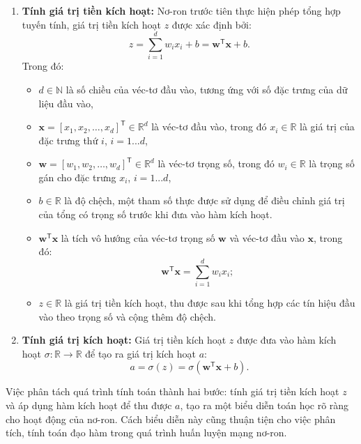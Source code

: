 \begin{enumerate}
    \item \textbf{Tính giá trị tiền kích hoạt:} Nơ-ron trước tiên thực hiện phép tổng hợp tuyến tính, giá trị tiền kích hoạt \(z\) được xác định bởi:
\begin{equation*}
    z = \sum_{i=1}^{d} w_i x_i + b
      = \mathbf{w}^{\mathsf T}\mathbf{x}+b.
\end{equation*}
Trong đó:
\begin{itemize}
    \item \(d\in\mathbb{N}\) là số chiều của véc-tơ đầu vào, tương ứng với số đặc trưng của dữ liệu đầu vào,
    
    \item \(\mathbf{x}=[x_1,x_2,\ldots,x_d]^{\mathsf T}\in\mathbb{R}^d\) là véc-tơ đầu vào, trong đó \(x_i\in\mathbb{R}\) là giá trị của đặc trưng thứ \(i\), $i = 1...d$,
    
    \item \(\mathbf{w}=[w_1,w_2,\ldots,w_d]^{\mathsf T}\in\mathbb{R}^d\) là véc-tơ trọng số, trong đó \(w_i\in\mathbb{R}\) là trọng số gán cho đặc trưng \(x_i\), $i = 1...d$,
    
    \item \(b\in\mathbb{R}\) là độ chệch, một tham số thực được sử dụng để điều chỉnh giá trị của tổng có trọng số trước khi đưa vào hàm kích hoạt.

    \item $\mathbf{w}^{\mathsf T}\mathbf{x}$ là tích vô hướng của véc-tơ trọng số $\mathbf{w}$ và véc-tơ đầu vào $\mathbf{x}$, trong đó: $$\mathbf{w}^{\mathsf T}\mathbf{x}
    =\sum_{i=1}^{d}w_i x_i;$$
    
    \item \(z\in\mathbb{R}\) là giá trị tiền kích hoạt, thu được sau khi tổng hợp các tín hiệu đầu vào theo trọng số và cộng thêm độ chệch.
    \end{itemize}
    
    \item \textbf{Tính giá trị kích hoạt:} Giá trị tiền kích hoạt \(z\) được đưa vào hàm kích hoạt \(\sigma:\mathbb{R}\rightarrow\mathbb{R}\) để tạo ra giá trị kích hoạt \(a\):
    \begin{equation*}
    a=\sigma(z)
    =\sigma\left(\mathbf{w}^{\mathsf T}\mathbf{x}+b\right).
    \end{equation*}
\end{enumerate}

Việc phân tách quá trình tính toán thành hai bước: tính giá trị tiền kích hoạt \(z\) và áp dụng hàm kích hoạt để thu được \(a\), tạo ra một biểu diễn toán học rõ ràng cho hoạt động của nơ-ron. Cách biểu diễn này cũng thuận tiện cho việc phân tích, tính toán đạo hàm trong quá trình huấn luyện mạng nơ-ron.

